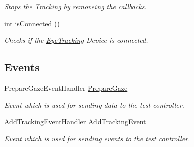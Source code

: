 \begin{DoxyCompactItemize}
\begin{DoxyCompactList}\small\item\em Stops the Tracking by removeing the callbacks. \end{DoxyCompactList}\item 
int \hyperlink{class_web_analyzer_1_1_eye_tracking_1_1_eye_tracking_model_a29a7377e721b88fbd80553699e1d7228}{is\+Connected} ()
\begin{DoxyCompactList}\small\item\em Checks if the \hyperlink{namespace_web_analyzer_1_1_eye_tracking}{Eye\+Tracking} Device is connected. \end{DoxyCompactList}\end{DoxyCompactItemize}
\subsection*{Events}
\begin{DoxyCompactItemize}
\item 
Prepare\+Gaze\+Event\+Handler \hyperlink{class_web_analyzer_1_1_eye_tracking_1_1_eye_tracking_model_a170dd57ad1784737ddf34dc14f82293d}{Prepare\+Gaze}
\begin{DoxyCompactList}\small\item\em Event which is used for sending data to the test controller. \end{DoxyCompactList}\item 
Add\+Tracking\+Event\+Handler \hyperlink{class_web_analyzer_1_1_eye_tracking_1_1_eye_tracking_model_af9985cde00e3f6c48694b7577e2689ea}{Add\+Tracking\+Event}
\begin{DoxyCompactList}\small\item\em Event which is used for sending events to the test controller. \end{DoxyCompactList}\end{DoxyCompactItemize}
